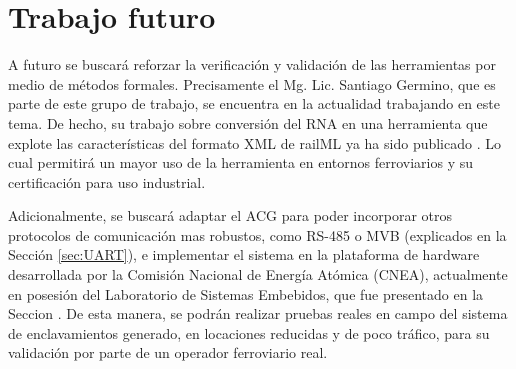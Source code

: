 \section{Trabajo futuro}

A futuro se buscará reforzar la verificación y validación de las herramientas por medio de métodos formales. Precisamente el Mg. Lic. Santiago Germino, que es parte de este grupo de trabajo, se encuentra en la actualidad trabajando en este tema. De hecho, su trabajo sobre conversión del RNA en una herramienta que explote las características del formato XML de railML ya ha sido publicado \cite{Paper_207}. Lo cual permitirá un mayor uso de la herramienta en entornos ferroviarios y su certificación para uso industrial.

Adicionalmente, se buscará adaptar el ACG para poder incorporar otros protocolos de comunicación mas robustos, como RS-485 o MVB (explicados en la Sección \ref{sec:UART}), e implementar el sistema en la plataforma de hardware desarrollada por la Comisión Nacional de Energía Atómica (CNEA), actualmente en posesión del Laboratorio de Sistemas Embebidos, que fue presentado en la Seccion \label{sec:GICSAFE}. De esta manera, se podrán realizar pruebas reales en campo del sistema de enclavamientos generado, en locaciones reducidas y de poco tráfico, para su validación por parte de un operador ferroviario real.



